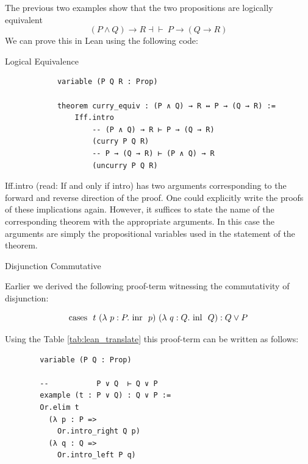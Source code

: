 \documentclass{book}
\begin{document}
    The previous two examples show that the two propositions are logically equivalent $$(P \land Q) \to R \dashv \vdash \ P \to (Q \to R)$$ We can prove this in Lean using the following code: 
    
    \begin{eg}{Logical Equivalence}
        \begin{lstlisting}
            variable (P Q R : Prop)

            theorem curry_equiv : (P ∧ Q) → R ↔ P → (Q → R) :=
                Iff.intro
                    -- (P ∧ Q) → R ⊢ P → (Q → R)
                    (curry P Q R)
                    -- P → (Q → R) ⊢ (P ∧ Q) → R
                    (uncurry P Q R)
        \end{lstlisting}
        Iff.intro (read: If and only if intro) has two arguments corresponding to the forward and reverse direction of the proof. One could explicitly write the proofs of these implications again. However, it suffices to state the name of the corresponding theorem with the appropriate arguments. In this case the arguments are simply the propositional variables used in the statement of the theorem. 
    \end{eg}

    \newpage
    \begin{eg}{Disjunction Commutative}

        Earlier we derived the following proof-term witnessing the commutativity of disjunction:

        $$ \text{cases } \ t \ (\lambda \ p : P. \ \text{inr } \ p) \ (\lambda \ q : Q. \ \text{inl } \ Q) : Q \lor P $$

        Using the Table \ref{tab:lean_translate} this proof-term can be written as follows:

        \begin{lstlisting}
        variable (P Q : Prop)

        --           P ∨ Q  ⊢ Q ∨ P
        example (t : P ∨ Q) : Q ∨ P :=
        Or.elim t
          (λ p : P =>
            Or.intro_right Q p)
          (λ q : Q =>
            Or.intro_left P q)  
        \end{lstlisting}
    \end{eg}
\end{document}
